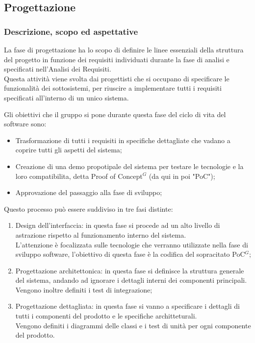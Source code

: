 \subsection{Progettazione}

\subsubsection{Descrizione, scopo ed aspettative}
La fase di progettazione ha lo scopo di definire le linee essenziali della struttura del progetto in funzione dei requisiti individuati durante la fase di analisi e specificati nell’Analisi dei Requisiti. \\
Questa attività viene svolta dai progettisti che si occupano di specificare le funzionalità dei sottosistemi, per riuscire a implementare tutti i requisiti specificati all'interno di un unico sistema.

Gli obiettivi che il gruppo si pone durante questa fase del ciclo di vita del software sono:
\begin{itemize}
    \item Trasformazione di tutti i requisiti in specifiche dettagliate che vadano a coprire tutti gli aspetti del sistema;
    \item Creazione di una demo propotipale del sistema per testare le tecnologie e la loro compatibilita, detta Proof of Concept$^{G}$ (da qui in poi "PoC");
    \item Approvazione del passaggio alla fase di sviluppo;
\end{itemize}

Questo processo può essere suddiviso in tre fasi distinte:
\begin{enumerate}
    \item Design dell'interfaccia: in questa fase si procede ad un alto livello di astrazione rispetto al funzionamento interno del sistema.\\
          L'attenzione è focalizzata sulle tecnologie che verranno utilizzate nella fase di sviluppo software, l'obiettivo di questa fase è la codifica del sopracitato PoC$^{G}$; 
    \item Progettazione architettonica: in questa fase si definisce la struttura generale del sistema, andando ad ignorare i dettagli interni dei componenti principali. \\
          Vengono inoltre definiti i test di integrazione;
    \item Progettazione dettagliata: in questa fase si vanno a specificare i dettagli di tutti i componenti del prodotto e le specifiche architteturali. \\
          Vengono definiti i diagrammi delle classi e i test di unità per ogni componente del prodotto.
\end{enumerate}
